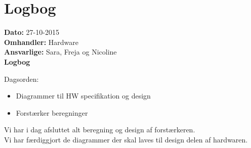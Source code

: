
\section{Logbog}

\textbf{Dato:} 27-10-2015 \\
\textbf{Omhandler:} Hardware \\
\textbf{Ansvarlige:} Sara, Freja og Nicoline \\
\textbf{Logbog}

Dagsorden:
\begin{itemize}
	\item Diagrammer til HW specifikation og design
	\item Forstærker beregninger
\end{itemize}

Vi har i dag afsluttet alt beregning og design af forstærkeren.\\
Vi har færdiggjort de diagrammer der skal laves til design delen af hardwaren.\\
   
